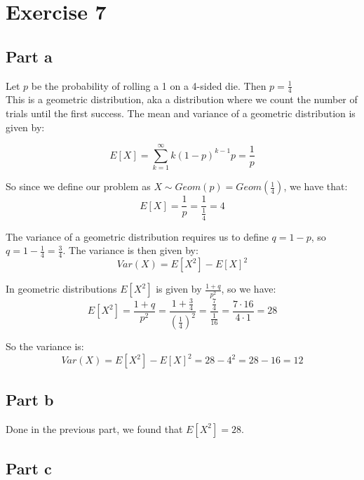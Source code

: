 \section{Exercise 7}

\subsection{Part a}

Let $p$ be the probability of rolling a 1 on a 4-sided die. Then $p = \frac{1}{4}$\\

This is a geometric distribution, aka a distribution where we count the number of trials until the first success. The mean and variance of a geometric distribution is given by:

\[
	E[X] = \sum_{k=1}^{\infty}k(1-p)^{k-1}p = \frac{1}{p}
\]

So since we define our problem as $X \sim Geom(p) = Geom\left(\frac{1}{4}\right)$, we have that:
\[
	E[X] = \frac{1}{p} = \frac{1}{\frac{1}{4}} = 4
\]

The variance of a geometric distribution requires us to define $q = 1-p$, so $q = 1-\frac{1}{4} = \frac{3}{4}$. The variance is then given by:
\[
	Var(X) = E[X^2] - E[X]^2
\]

In geometric distributions $E[X^2]$ is given by $\frac{1+q}{p^2}$, so we have:
\[
	E[X^2] = \frac{1+q}{p^2} = \frac{1+\frac{3}{4}}{\left(\frac{1}{4}\right)^2} = \frac{\frac{7}{4}}{\frac{1}{16}} = \frac{7\cdot 16}{4\cdot 1} = 28
\]

So the variance is:
\[
	Var(X) = E[X^2] - E[X]^2 = 28 - 4^2 = 28 - 16 = 12
\]

\subsection{Part b}

Done in the previous part, we found that $E[X^2] = 28$.

\subsection{Part c}

